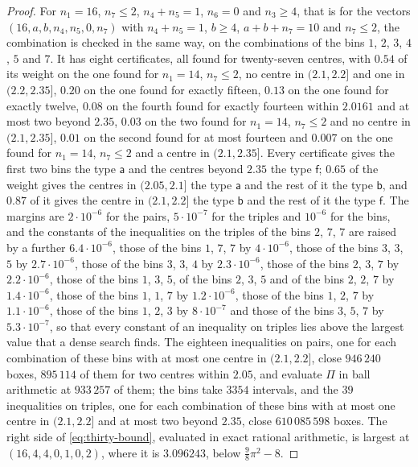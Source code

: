 \documentclass[11pt,reqno]{amsart}
\renewcommand{\_}{\origunderscore\allowbreak}
\numberwithin{equation}{section}
\theoremstyle{plain}
\theoremstyle{definition}
\theoremstyle{remark}
\begin{document}
\begin{proof}
For $n_1=16$, $n_7\le2$, $n_4+n_5=1$, $n_6=0$ and $n_3\ge4$, that is
for the vectors $(16,a,b,n_4,n_5,0,n_7)$ with $n_4+n_5=1$, $b\ge4$,
$a+b+n_7=10$ and $n_7\le2$, the combination is checked in the same way, on
the combinations of the bins $1$, $2$, $3$, $4$, $5$ and $7$. It has eight
certificates, all found for twenty-seven centres, with $0.54$ of its weight
on the one found for $n_1=14$, $n_7\le2$, no centre in $(2.1,2.2]$ and one
in $(2.2,2.35]$, $0.20$ on the one found for exactly fifteen, $0.13$ on
the one found for exactly twelve, $0.08$ on the fourth found for exactly
fourteen within $2.0161$ and at most two beyond $2.35$, $0.03$ on the two
found for $n_1=14$, $n_7\le2$ and no centre in $(2.1,2.35]$, $0.01$ on the
second found for at most fourteen and $0.007$ on the one found for
$n_1=14$, $n_7\le2$ and a centre in $(2.1,2.35]$. Every certificate gives
the first two bins the type $\mathsf a$ and the centres beyond $2.35$ the
type $\mathsf f$; $0.65$ of the weight gives the centres in $(2.05,2.1]$
the type $\mathsf a$ and the rest of it the type $\mathsf b$, and $0.87$ of
it gives the centre in $(2.1,2.2]$ the type $\mathsf b$ and the rest of it
the type $\mathsf f$. The margins are $2\cdot10^{-6}$ for the pairs,
$5\cdot10^{-7}$ for the triples and $10^{-6}$ for the bins, and the
constants of the inequalities on the triples of the bins $2$, $7$, $7$ are
raised by a further $6.4\cdot10^{-6}$, those of the bins $1$, $7$, $7$ by
$4\cdot10^{-6}$, those of the bins $3$, $3$, $5$ by $2.7\cdot10^{-6}$,
those of the bins $3$, $3$, $4$ by $2.3\cdot10^{-6}$, those of the bins
$2$, $3$, $7$ by $2.2\cdot10^{-6}$, those of the bins $1$, $3$, $5$, of
the bins $2$, $3$, $5$ and of the bins $2$, $2$, $7$ by
$1.4\cdot10^{-6}$, those of the bins $1$, $1$, $7$ by $1.2\cdot10^{-6}$,
those of the bins $1$, $2$, $7$ by $1.1\cdot10^{-6}$, those of the bins
$1$, $2$, $3$ by $8\cdot10^{-7}$ and those of the bins $3$, $5$, $7$ by
$5.3\cdot10^{-7}$, so that every constant of an inequality on triples lies
above the largest value that a dense search finds. The eighteen
inequalities on pairs, one for each combination of these bins with at most
one centre in $(2.1,2.2]$, close $946\,240$ boxes, $895\,114$ of them for
two centres within $2.05$, and evaluate $\Pi$ in ball arithmetic at
$933\,257$ of them; the bins take $3354$ intervals, and the $39$
inequalities on triples, one for each combination of these bins with at
most one centre in $(2.1,2.2]$ and at most two beyond $2.35$, close
$610\,085\,598$ boxes. The right side of \eqref{eq:thirty-bound},
evaluated in exact rational arithmetic, is largest at $(16,4,4,0,1,0,2)$,
where it is $3.096243$, below $\frac98\pi^2-8$.


\end{proof}
\end{document}
